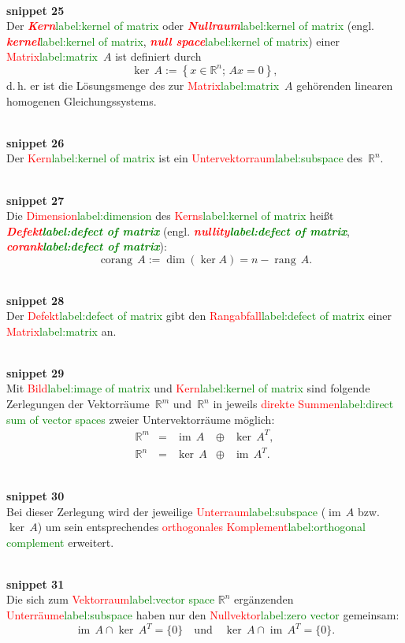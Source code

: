 \documentclass[a4paper,twoside,english,ngerman,deutsch,german,sectrefs,envcountsame,envcountchap]{svmono}
\newcommand{\setref}[2]{\textcolor{red}{#1}\textcolor{green}{#2}}
\newcommand{\snippet}[1]{\\\textbf{snippet #1}\\}
\begin{document}
\snippet{25}
Der \setref{\textbf{\em Kern}}{label:kernel of matrix} oder \setref{\textbf{\em Nullraum}}{label:kernel of matrix} (engl. \setref{\textbf{\em kernel}}{label:kernel of matrix}, \setref{\textbf{\em null space}}{label:kernel of matrix}) einer \setref{Matrix}{label:matrix}~$A$ ist definiert durch
\[
\ker\,A:=\left\{ x\in{\mathbb{R}}^{n};\,Ax=0\right\} ,
\]
d.\,h. er ist die Lösungsmenge des zur \setref{Matrix}{label:matrix}~$A$ gehörenden linearen homogenen Gleichungssystems.

\snippet{26}
Der \setref{Kern}{label:kernel of matrix} ist ein \setref{Untervektorraum}{label:subspace} des~${\mathbb{R}}^{n}$.

\snippet{27}
Die \setref{Dimension}{label:dimension} des \setref{Kerns}{label:kernel of matrix} heißt \textbf{\em \setref{Defekt}{label:defect of matrix}} (engl. \textbf{\em \setref{nullity}{label:defect of matrix}},
\textbf{\em \setref{corank}{label:defect of matrix}}):
\begin{equation}
{\operatorname{corang}}\,A:=\dim(\ker A)=n-{\operatorname{rang}}\,A.\label{eq:corank}
\end{equation}

\snippet{28}
Der \setref{Defekt}{label:defect of matrix} gibt den \setref{Rangabfall}{label:defect of matrix} einer \setref{Matrix}{label:matrix} an.

\snippet{29}
Mit \setref{Bild}{label:image of matrix} und \setref{Kern}{label:kernel of matrix} sind folgende Zerlegungen der Vektorräume~${\mathbb{R}}^{m}$ und~${\mathbb{R}}^{n}$ in jeweils \setref{direkte Summen}{label:direct sum of vector spaces} zweier Untervektorräume möglich:
\begin{equation}
\begin{array}{lcccc}
{\mathbb{R}}^{m} & = & {\operatorname{im}}\,A & \oplus & \ker\,A^{T},\\ {\mathbb{R}}^{n} & = & \ker\,A & \oplus & {\operatorname{im}}\,A^{T}.
\end{array}\label{eq:zerleg-im-ker}
\end{equation}

\snippet{30}
Bei dieser Zerlegung wird der jeweilige \setref{Unterraum}{label:subspace} ($\operatorname{im}\,A$ bzw. $\ker\,A$) um sein entsprechendes \setref{orthogonales Komplement}{label:orthogonal complement} erweitert.

\snippet{31}
Die sich zum \setref{Vektorraum}{label:vector space} ${\mathbb{R}}^{n}$ ergänzenden \setref{Unterräume}{label:subspace} haben nur den \setref{Nullvektor}{label:zero vector} gemeinsam:
\[
{\operatorname{im}}\,A\cap\ker\,A^{T}=\{0\}\quad\text{und}\quad\ker\,A\cap{\operatorname{im}}\,A^{T}=\{0\}.
\]
\end{document}
